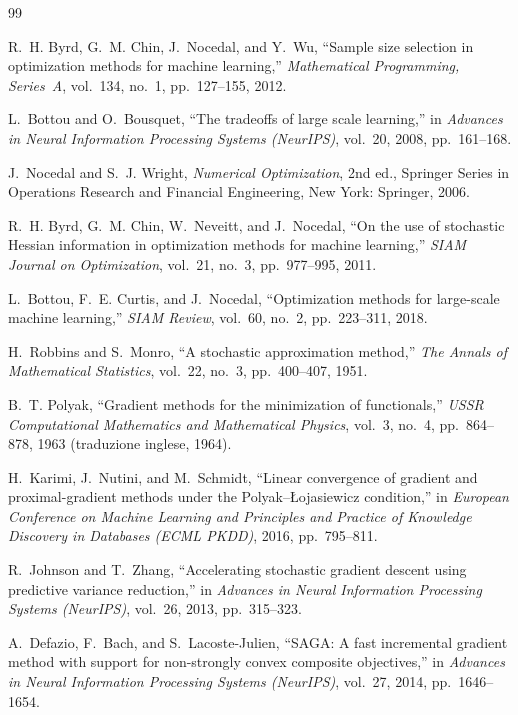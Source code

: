 \documentclass[a4paper,12pt]{article}
\numberwithin{equation}{section}
\numberwithin{figure}{section}
\numberwithin{table}{section}
\begin{document}
\begin{thebibliography}{99}

R.~H. Byrd, G.~M. Chin, J.~Nocedal, and Y.~Wu,
``Sample size selection in optimization methods for machine learning,''
\textit{Mathematical Programming, Series~A}, vol.~134, no.~1, pp.~127--155,
2012.

L.~Bottou and O.~Bousquet,
``The tradeoffs of large scale learning,''
in \textit{Advances in Neural Information Processing Systems (NeurIPS)},
vol.~20, 2008, pp.~161--168.

J.~Nocedal and S.~J. Wright,
\textit{Numerical Optimization}, 2nd ed.,
Springer Series in Operations Research and Financial Engineering,
New York: Springer, 2006.

R.~H. Byrd, G.~M. Chin, W.~Neveitt, and J.~Nocedal,
``On the use of stochastic Hessian information in optimization methods for
machine learning,''
\textit{SIAM Journal on Optimization}, vol.~21, no.~3, pp.~977--995, 2011.

L.~Bottou, F.~E. Curtis, and J.~Nocedal,
``Optimization methods for large-scale machine learning,''
\textit{SIAM Review}, vol.~60, no.~2, pp.~223--311, 2018.

H.~Robbins and S.~Monro,
``A stochastic approximation method,''
\textit{The Annals of Mathematical Statistics}, vol.~22, no.~3,
pp.~400--407, 1951.

B.~T. Polyak,
``Gradient methods for the minimization of functionals,''
\textit{USSR Computational Mathematics and Mathematical Physics},
vol.~3, no.~4, pp.~864--878, 1963 (traduzione inglese, 1964).

H.~Karimi, J.~Nutini, and M.~Schmidt,
``Linear convergence of gradient and proximal-gradient methods under the
Polyak--{\L}ojasiewicz condition,''
in \textit{European Conference on Machine Learning and Principles and
Practice of Knowledge Discovery in Databases (ECML PKDD)}, 2016,
pp.~795--811.

R.~Johnson and T.~Zhang,
``Accelerating stochastic gradient descent using predictive variance
reduction,''
in \textit{Advances in Neural Information Processing Systems (NeurIPS)},
vol.~26, 2013, pp.~315--323.

A.~Defazio, F.~Bach, and S.~Lacoste-Julien,
``SAGA: A fast incremental gradient method with support for non-strongly
convex composite objectives,''
in \textit{Advances in Neural Information Processing Systems (NeurIPS)},
vol.~27, 2014, pp.~1646--1654.


\end{thebibliography}
\end{document}
